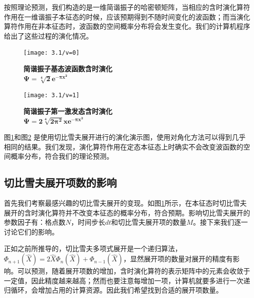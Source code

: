 按照理论预测，我们构造的是一维简谐振子的哈密顿矩阵，当相应的含时演化算符作用在一维谐振子本征态的时候，应该预期得到不随时间变化的波函数；而当演化算符作用在非本征态时，波函数的空间概率分布将会发生变化。我们的计算机程序给出了这些过程的演化情况。
\begin{figure}[hbt]
  \centering
  \captionsetup{justification=centering}
  \vspace{1mm}
  \texttt{[image: 3.1/v=0]}
  \caption{\textbf{简谐振子基态波函数含时演化} \\
            $\boldsymbol{\Psi = \sqrt[4]{2}e^{-\pi x^2}}$ \label{fig:prop1}}
\end{figure}

\begin{figure}[hbt]
  \centering
  \captionsetup{justification=centering}
  \vspace{1mm}
  \texttt{[image: 3.1/v=1]} 
  \caption{\textbf{简谐振子第一激发态含时演化}\\
            $\boldsymbol{\Psi = 2\sqrt[4]{2\pi^2}x e^{-\pi x^2}}$  \label{fig:prop2}}
\end{figure}

图\ref{fig:prop1}和图\ref{fig:prop2} 是使用切比雪夫展开进行的演化演示图，使用对角化方法可以得到几乎相同的结果。我们发现，演化算符作用在定态本征态上时确实不会改变波函数的空间概率分布，符合我们的理论预测。


\subsection{切比雪夫展开项数的影响}
首先我们考察最感兴趣的切比雪夫展开的变现。如图\ref{fig:prop1}所示，在本征态时切比雪夫展开的含时演化算符并不改变本征态的概率分布，符合预期。影响切比雪夫展开的参数因子有：格点数$N$，时间步长$dt$和切比雪夫展开项的数量$M$。接下来我们逐一讨论它们的影响。

正如之前所推导的，切比雪夫多项式展开是一个递归算法，$\Phi_{n+1}(\hat{X}) = 2\hat{X}\Phi_{n}(\hat{X}) + \Phi_{n-1}(\hat{X})$，显然展开项的数量对展开的精度有影响。可以预测，随着展开项数的增加，含时演化算符的表示矩阵中的元素会收敛于一定值，因此精度越来越高；然而也要注意每增加一项，计算机就要多进行一次递归循环，会增加占用的计算资源。因此我们希望找到合适的展开项数量。


